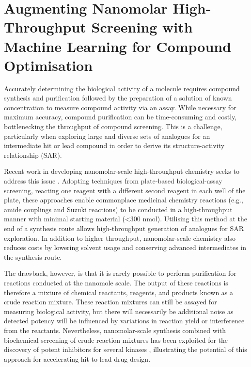 \chapter{Augmenting Nanomolar High-Throughput Screening with Machine Learning for Compound Optimisation} \label{ch:testing}

Accurately determining the biological activity of a molecule requires compound synthesis and purification followed by the preparation of a solution of known concentration to measure compound activity via an assay. While necessary for maximum accuracy, compound purification can be time-consuming and costly, bottlenecking the throughput of compound screening. This is a challenge, particularly when exploring large and diverse sets of analogues for an intermediate hit or lead compound in order to derive its structure-activity relationship (SAR).

Recent work in developing nanomolar-scale high-throughput chemistry seeks to address this issue \cite{Santarilla2015MerckNanomolar, Perera2018PfizerNanomolar, Gehrtz2022nanomolar}. Adopting techniques from plate-based biological-assay screening, reacting one reagent with a different second reagent in each well of the plate, these approaches enable commonplace medicinal chemistry reactions (e.g., amide couplings and Suzuki reactions) to be conducted in a high-throughput manner with minimal starting material (<300 nmol). Utilising this method at the end of a synthesis route allows high-throughput generation of analogues for SAR exploration. In addition to higher throughput, nanomolar-scale chemistry also reduces costs by lowering solvent usage and conserving advanced intermediates in the synthesis route. 

The drawback, however, is that it is rarely possible to perform purification for reactions conducted at the nanomole scale. The output of these reactions is therefore a mixture of chemical reactants, reagents, and products known as a crude reaction mixture. These reaction mixtures can still be assayed for measuring biological activity, but there will necessarily be additional noise as detected potency will be influenced by variations in reaction yield or interference from the reactants. Nevertheless, nanomolar-scale synthesis combined with biochemical screening of crude reaction mixtures has been exploited for the discovery of potent inhibitors for several kinases \cite{Gesmundo2018nanosar, Gehrtz2022nanomolar}, illustrating the potential of this approach for accelerating hit-to-lead drug design.

